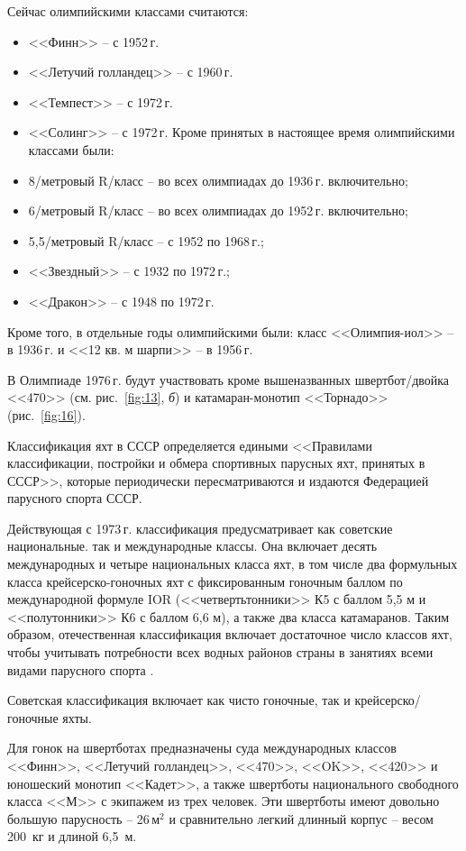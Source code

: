 \documentclass[a4paper, 12pt, twoside, final]{scrbook}
\begin{document}
Сейчас олимпийскими классами считаются:
\begin{itemize}
\item <<Финн>> \--- с 1952\,г.
\item <<Летучий голландец>> \--- с 1960\,г.
\item <<Темпест>> \--- с 1972\,г.
\item <<Солинг>> \--- с 1972\,г. Кроме принятых в настоящее время олимпийскими
классами были:
\item 8\-/метровый R\-/класс \--- во всех олимпиадах до 1936\,г. включительно;
\item  6\-/метровый R\-/класс \--- во всех олимпиадах до 1952\,г. включительно;
\item 5,5\-/метровый R\-/класс \--- с 1952 по 1968\,г.;
\item <<Звездный>> \--- с 1932 по 1972\,г.;
\item <<Дракон>> \--- с 1948 по 1972\,г.
\end{itemize}
Кроме того, в отдельные годы олимпийскими были: класс <<Олимпия-иол>> \--- в 1936\,г. и <<12 кв. м шарпи>> \--- в 1956\,г.

В Олимпиаде 1976\,г. будут участвовать кроме вышеназванных швертбот\-/двойка <<470>> (см. рис.~\ref{fig:13}, \emph{б}) и катамаран-монотип <<Торнадо>> (рис.~\ref{fig:16}).

Классификация яхт в СССР определяется едиными <<Правилами классификации,
постройки и обмера спортивных парусных яхт, принятых в СССР>>, которые
периодически пересматриваются и издаются Федерацией парусного спорта
СССР.

Действующая с 1973\,г. классификация предусматривает как советские
национальные. так и международные классы. Она включает десять международных
и четыре национальных класса яхт, в том числе два формульных класса
крейсерско-гоночных яхт с фиксированным гоночным баллом по международной
формуле IOR (<<четвертьтонники>> К5 с баллом 5,5 м и <<полутонники>>
К6 с баллом 6,6 м), а также два класса катамаранов. Таким образом,
отечественная классификация включает достаточное число классов яхт,
чтобы учитывать потребности всех водных районов страны в занятиях
всеми видами парусного спорта .

Советская классификация включает как чисто гоночные, так и крейсерско\-/гоночные
яхты.

Для гонок на швертботах предназначены суда международных классов <<Финн>>,
<<Летучий голландец>>, <<470>>, <<OK>>, <<420>> и юношеский
монотип <<Кадет>>, а также швертботы национального свободного класса
<<М>> с экипажем из трех человек. Эти швертботы имеют довольно большую
парусность \--- 26\,$\mbox{м}^2$ и сравнительно легкий длинный корпус \--- весом 200~кг и длиной 6,5~м.
\end{document}
